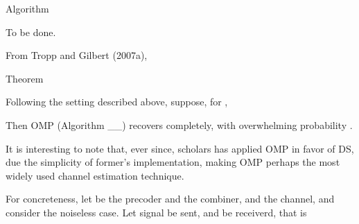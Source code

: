 \Result
{Algorithm}
{
\startitemize[n]
\item To be done.
\stopitemize
}

From Tropp and Gilbert (2007a),

\Result
{Theorem}
{
Following the setting described above, suppose, for ,


Then OMP (Algorithm \_\_) recovers  completely, with overwhelming probability .
}

It is interesting to note that, ever since, scholars has applied OMP in favor of DS, due the simplicity of former's implementation, making OMP perhaps the most widely used channel estimation technique.

\stopsection
\startsection [title={OMP used in Channel Sensing}]

For concreteness, let  be the precoder and  the combiner, and  the channel, and consider the noiseless case.
Let signal  be sent, and  be receiverd, that is



